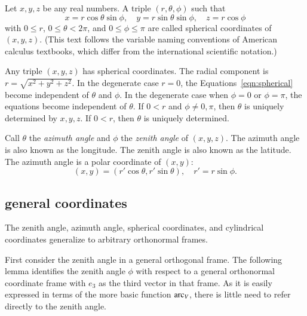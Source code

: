 \begin{definition}
Let $x,y,z$ be any real numbers.  A
triple $(r,\theta,\phi)$ such that
    \begin{equation}
    \label{eqn:spherical}
    x = r\cos\theta\sin\phi,\quad y = r\sin\theta\sin\phi,\quad
    z = r\cos\phi
    \end{equation}
with $0\le r$, $0\le\theta<2\pi$, and $0\le\phi\le\pi$ are called
spherical coordinates of $(x,y,z)$.  (This text follows the variable
naming conventions of American calculus textbooks, which differ
from the international scientific notation.)
\end{definition}
%
%
%
%
%

Any triple $(x,y,z)$ has spherical coordinates.
The radial component is $r = \sqrt{x^2+y^2+z^2}$.  In the degenerate case $r=0$,
the Equations~\ref{eqn:spherical} become independent of $\theta$
and $\phi$. In the degenerate case when $\phi = 0$ or $\phi =
\pi$, the equations become independent of $\theta$. If $0<r$ and $\phi\ne 0,\pi$,  then $\theta$ is uniquely
determined by $x,y,z$. If $0<r$, then $\theta$ is uniquely determined.


Call $\theta$ the {\it azimuth angle\/} and $\phi$ the {\it
zenith angle\/} of $(x,y,z)$.  The azimuth angle is also known as
the longitude.  The zenith angle is also known as the latitude. The
azimuth angle is a polar coordinate of $(x,y)$:
    $$
    (x,y) = (r'\cos\theta,r'\sin\theta), \quad r' = r\sin\phi.
    $$
%
%
%
%
%
%
%


\subsection{general coordinates}

%
The zenith angle, azimuth angle,
spherical coordinates, and cylindrical coordinates 
generalize to arbitrary orthonormal frames.

First consider the zenith angle in a general orthogonal frame.
The following lemma identifies the zenith angle $\phi$ with respect to
a general orthonormal coordinate frame with $e_3$ as the third
vector in that frame.  As it is easily expressed in terms
of the more basic function $\operatorname{arc}_V$, 
there is little need to refer directly to the zenith angle.
%


